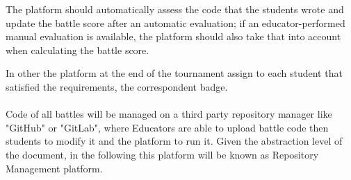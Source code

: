 The platform should automatically assess the code that the students wrote and update the battle score after an automatic evaluation; if an educator-performed manual evaluation is available, the platform should also take that into account when calculating the 
battle score.

In other the platform at the end of the tournament assign to each student that satisfied the requirements, the correspondent badge.\\
\\
Code of all battles will be managed on a third party repository manager like "GitHub" or "GitLab", where Educators are able to upload battle code then students to modify it and the platform to run it. Given the abstraction level of the document, in the following this platform will be known as Repository Management platform.

\newpage

